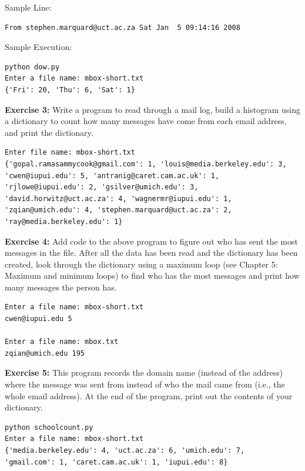 \documentclass[10pt,]{book}
\begin{document}
Sample Line:

{\small
\begin{verbatim}
From stephen.marquard@uct.ac.za Sat Jan  5 09:14:16 2008
\end{verbatim}
}

Sample Execution:

{\small
\begin{verbatim}
python dow.py
Enter a file name: mbox-short.txt
{'Fri': 20, 'Thu': 6, 'Sat': 1}
\end{verbatim}
}

\textbf{Exercise 3:} Write a program to read through a mail log, build a
histogram using a dictionary to count how many messages have come from
each email address, and print the dictionary.

{\small
\begin{verbatim}
Enter file name: mbox-short.txt
{'gopal.ramasammycook@gmail.com': 1, 'louis@media.berkeley.edu': 3,
'cwen@iupui.edu': 5, 'antranig@caret.cam.ac.uk': 1,
'rjlowe@iupui.edu': 2, 'gsilver@umich.edu': 3,
'david.horwitz@uct.ac.za': 4, 'wagnermr@iupui.edu': 1,
'zqian@umich.edu': 4, 'stephen.marquard@uct.ac.za': 2,
'ray@media.berkeley.edu': 1}
\end{verbatim}
}

\textbf{Exercise 4:} Add code to the above program to figure out who has
sent the most messages in the file. After all the data has been read and
the dictionary has been created, look through the dictionary using a
maximum loop (see Chapter 5: Maximum and minimum loops) to find who has
the most messages and print how many messages the person has.

{\small
\begin{verbatim}
Enter a file name: mbox-short.txt
cwen@iupui.edu 5

Enter a file name: mbox.txt
zqian@umich.edu 195
\end{verbatim}
}

\textbf{Exercise 5:} This program records the domain name (instead of
the address) where the message was sent from instead of who the mail
came from (i.e., the whole email address). At the end of the program,
print out the contents of your dictionary.

{\small
\begin{verbatim}
python schoolcount.py
Enter a file name: mbox-short.txt
{'media.berkeley.edu': 4, 'uct.ac.za': 6, 'umich.edu': 7,
'gmail.com': 1, 'caret.cam.ac.uk': 1, 'iupui.edu': 8}
\end{verbatim}
}
\end{document}
